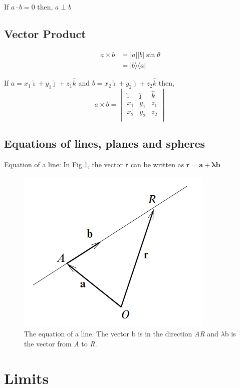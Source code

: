 \documentclass[12pt]{article}
\begin{document}
If $a \cdot b = 0$ then, $ a \perp b$

\subsection{Vector Product}
\begin{align*}
a\times b &= \lvert a \rvert \lvert b \rvert \sin\theta \\
&=|b\rangle \langle a|
\end{align*}

If $a = x_1 \hat{\imath} + y_1 \hat{\jmath} + z_1 \hat{k}$ and $b = x_2 \hat{\imath} + y_2 \hat{\jmath} + z_2 \hat{k}$ then,
$$
a \times b =  
\begin{vmatrix}
\hat{\imath} & \hat{\jmath} & \hat{k} \\
x_1 & y_1 & z_1 \\
x_2 & y_2 & z_2 \\
\end{vmatrix}
$$

\subsection{Equations of lines, planes and spheres}

Equation of a line:
In Fig.\ref{eqnline}, the vector {\bfseries r} can be written as $\mathbf{r} = \mathbf{a + \lambda b}$
\begin{figure}[H]
	\centering
	\includegraphics[scale=0.75]{line}
	\caption{\label{eqnline} The equation of a line. The vector b is in the direction \emph{AR} and $\mathcal{\lambda}$b is the vector from \emph{A} to \emph{R}.}
\end{figure}

\section{Limits}
\end{document}
